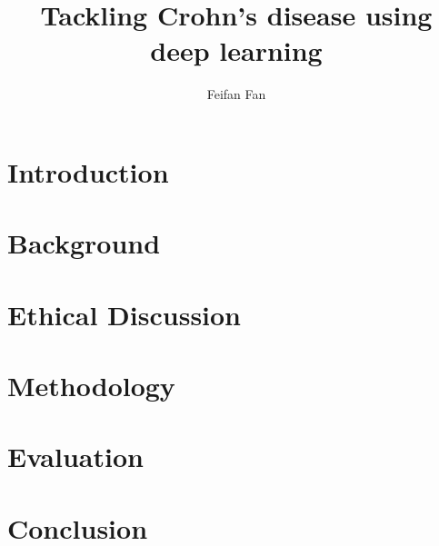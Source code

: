 \documentclass[a4paper,11pt,twoside]{report}
\begin{document}
\title{Tackling Crohn's disease using deep learning}
\author{Feifan Fan}





\tableofcontents
\listoffigures
\listoftables

\chapter{Introduction}
\label{cha:introduction}


\chapter{Background}
\label{cha:background}


\chapter{Ethical Discussion}
\label{cha:ethical-discussion}


\chapter{Methodology}
\label{cha:Methodology}


\chapter{Evaluation}
\label{cha:Evaluation}


\chapter{Conclusion}
\label{cha:Conclusion}



\end{document}
